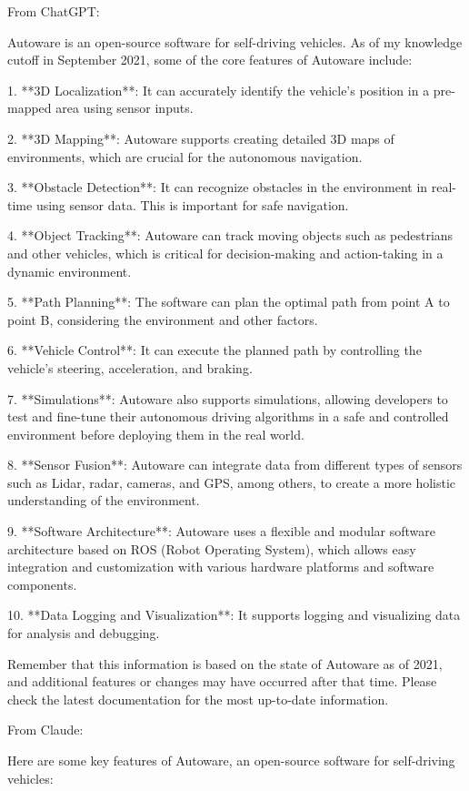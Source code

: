 From ChatGPT:

Autoware is an open-source software for self-driving vehicles. As of my knowledge cutoff in September 2021, some of the core features of Autoware include:

1. **3D Localization**: It can accurately identify the vehicle's position in a pre-mapped area using sensor inputs.

2. **3D Mapping**: Autoware supports creating detailed 3D maps of environments, which are crucial for the autonomous navigation.

3. **Obstacle Detection**: It can recognize obstacles in the environment in real-time using sensor data. This is important for safe navigation.

4. **Object Tracking**: Autoware can track moving objects such as pedestrians and other vehicles, which is critical for decision-making and action-taking in a dynamic environment.

5. **Path Planning**: The software can plan the optimal path from point A to point B, considering the environment and other factors.

6. **Vehicle Control**: It can execute the planned path by controlling the vehicle's steering, acceleration, and braking.

7. **Simulations**: Autoware also supports simulations, allowing developers to test and fine-tune their autonomous driving algorithms in a safe and controlled environment before deploying them in the real world.

8. **Sensor Fusion**: Autoware can integrate data from different types of sensors such as Lidar, radar, cameras, and GPS, among others, to create a more holistic understanding of the environment.

9. **Software Architecture**: Autoware uses a flexible and modular software architecture based on ROS (Robot Operating System), which allows easy integration and customization with various hardware platforms and software components.

10. **Data Logging and Visualization**: It supports logging and visualizing data for analysis and debugging.

Remember that this information is based on the state of Autoware as of 2021, and additional features or changes may have occurred after that time. Please check the latest documentation for the most up-to-date information.


From Claude:

Here are some key features of Autoware, an open-source software for self-driving vehicles:

